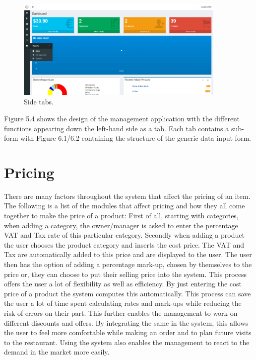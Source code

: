 \begin{figure}[h!]
	\caption{Side tabs.}
	\label{image:myImageName}
	\centering
	\includegraphics[width=0.9\textwidth]{Fig images/sidetab.png}
\end{figure}
  Figure 5.4 shows the design of the management application with the different functions appearing down the left-hand side as a tab. Each tab contains a sub-form with Figure 6.1/6.2 containing the structure of the generic data input form.
  
\section{Pricing}

There are many factors throughout the system that affect the pricing of an item. The following is a list of the modules that affect pricing and how they all come together to make the price of a product:
First of all, starting with categories, when adding a category, the owner/manager is asked to enter the percentage VAT and Tax rate of this particular category.
\newline
\newline
Secondly when adding a product the user chooses the product category and inserts the cost price. The VAT and Tax are automatically added to this price and are displayed to the user.
The user then has the option of adding a percentage mark-up, chosen by themselves to the price or, they can choose to put their selling price into the system. 
\newline
\newline
This process offers the user a lot of flexibility as well as efficiency. By just entering the cost price of a product the system computes this automatically. This process can save the user a lot of time spent calculating rates and mark-ups while reducing the risk of errors on their part. This further enables the management to work on different discounts and offers. By integrating the same in the system, this allows the user to feel more comfortable while making an order and to plan future visits to the restaurant. Using the system also enables the management to react to the demand in the market more easily. 

